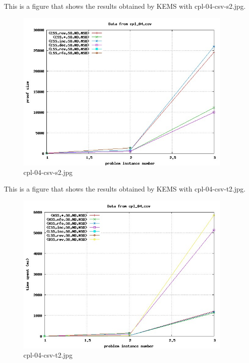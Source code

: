 This is a figure that shows the results obtained by KEMS with cpl-04-csv-s2.jpg.
\begin{figure}[htbp]
\begin{center}
\includegraphics[width=0.95\textwidth]{figuras/cpl-04-csv-s2.jpg}
\end{center}
\caption{cpl-04-csv-s2.jpg}
\end{figure}

This is a figure that shows the results obtained by KEMS with cpl-04-csv-t2.jpg.
\begin{figure}[htbp]
\begin{center}
\includegraphics[width=0.95\textwidth]{figuras/cpl-04-csv-t2.jpg}
\end{center}
\caption{cpl-04-csv-t2.jpg}
\end{figure}

